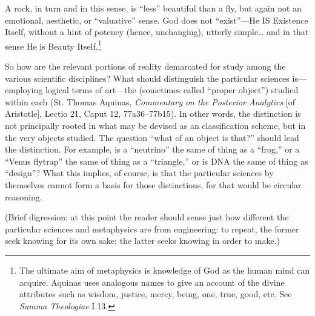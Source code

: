 A rock, in turn and in this sense, is ``less'' beautiful than a fly, but again not an emotional, aesthetic, or ``valuative'' sense. God does not ``exist''---He IS Existence Itself, without a hint of potency (hence, unchanging), utterly simple\ldots{} and in that sense He is Beauty Itself.\footnote{The ultimate aim of metaphysics is knowledge of God as the human mind can acquire. Aquinas uses analogous names to give an account of the divine attributes such as wisdom, justice, mercy, being, one, true, good, etc. See \textit{Summa Theologiae} I.13.}

So how are the relevant portions of reality demarcated for study among the various scientific disciplines? What should distinguish the particular sciences is---employing logical terms of art---the  (sometimes called ``proper object'') studied within each (St. Thomas Aquinas, \textit{Commentary on the Posterior Analytics} [of Aristotle], Lectio 21, Caput 12, 77a36--77b15). In other words, the distinction is not principally rooted in what may be devised as an  classification scheme, but in the very objects studied. The question ``what  of an object is that?'' should lead the distinction. For example, is a ``neutrino'' the same  of thing as a ``frog,'' or a ``Venus flytrap'' the same  of thing as a ``triangle,'' or is DNA the same  of thing as ``design''? What this implies, of course, is that the particular sciences by themselves cannot form a basis for those distinctions, for that would be circular reasoning.

(Brief digression: at this point the reader should sense just how different the particular sciences and metaphysics are from engineering: to repeat, the former seek knowing for its own sake; the latter seeks knowing in order to make.)

